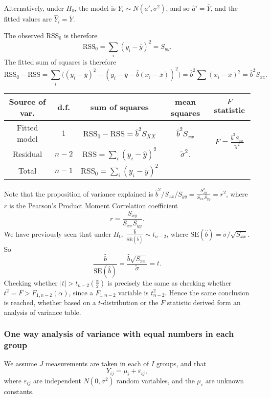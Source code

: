 \documentclass[a4paper]{article}
\begin{document}
Alternatively, under $H_0$, the model is $Y_i \sim N(a', \sigma^2)$, and so $\hat a' = \bar Y$, and the fitted values are $\hat Y_i = \bar Y$.

The observed $\mathrm{RSS}_0$ is therefore
\[
  \mathrm{RSS}_0 = \sum_i (y_i - \bar y)^2 = S_{yy}.
\]
The fitted sum of squares is therefore
\[
  \mathrm{RSS}_0 - \mathrm{RSS} = \sum_i \big((y_i - \bar y)^2 - (y_i - \bar y - \hat{b}(x_i - \bar x))^2\big) = \hat{b}^2 \sum (x_i - \bar x)^2 = \hat{b}^2 S_{xx}.
\]
\begin{tabular}{ccccc}
  \toprule
  Source of var. & d.f. & sum of squares & mean squares & $F$ statistic\\
  \midrule
  Fitted model & 1 & $\mathrm{RSS}_0 - \mathrm{RSS} = \hat{b}^2 S_{XX}$ & $\hat{b}^2 S_{xx}$ & \multirow{2}{*}{$F = \frac{\hat{b}^2 S_{xx}}{\tilde{\sigma}^2}$}\\
  Residual & $n - 2$ & $\mathrm{RSS} = \sum_i (y_i- \hat y)^2$ &  $\tilde{\sigma}^2$.\\
  \midrule
  Total & $n - 1$ & $\mathrm{RSS}_0 = \sum_i (y_i - \bar y)^2$\\
  \bottomrule
\end{tabular}

Note that the proposition of variance explained is $\hat{b}^2/S_{xx}/S_{yy} = \frac{S_{xy}^2}{S_{xx}S_{yy}} = r^2$, where $r$ is the Pearson's Product Moment Correlation coefficient
\[
  r = \frac{S_{xy}}{S_{xx}S_{yy}}.
\]
We have previously seen that under $H_0$, $\frac{\hat{b}}{\mathrm{SE}(\hat{b})} \sim t_{n - 2}$, where $\mathrm{SE}(\hat{b}) = \tilde{\sigma}/\sqrt{S_{xx}}$. So
\[
  \frac{\hat{b}}{\mathrm{SE}(\hat{b})} = \frac{\hat{b}\sqrt{S_{xx}}}{\tilde{\sigma}} = t.
\]
Checking whether $|t| > t_{n - 2}\left(\frac{\alpha}{2}\right)$ is precisely the same as checking whether $t^2 = F > F_{1, n - 2}(\alpha)$, since a $F_{1, n - 2}$ variable is $t_{n - 2}^2$.
Hence the same conclusion is reached, whether based on a $t$-distribution or the $F$ statistic derived form an analysis of variance table.

\subsubsection{One way analysis of variance with equal numbers in each group}
We assume $J$ measurements are taken in each of $I$ groups, and that
\[
  Y_{ij} = \mu_i + \varepsilon_{ij},
\]
where $\varepsilon_{ij}$ are independent $N(0, \sigma^2)$ random variables, and the $\mu_i$ are unknown constants.
\end{document}
